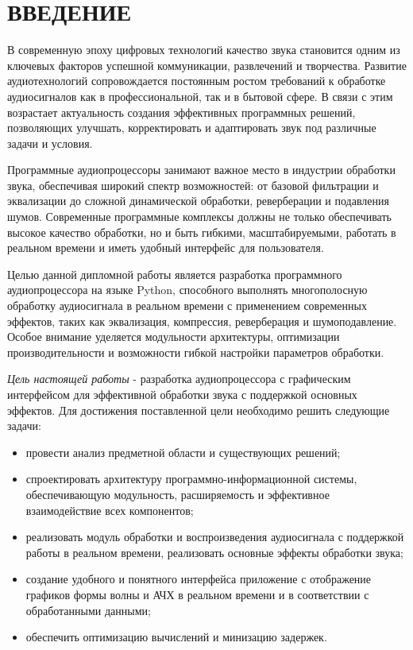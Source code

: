 \section*{ВВЕДЕНИЕ}

В современную эпоху цифровых технологий качество звука становится одним из ключевых факторов успешной коммуникации, развлечений и творчества. Развитие аудиотехнологий сопровождается постоянным ростом требований к обработке аудиосигналов как в профессиональной, так и в бытовой сфере. В связи с этим возрастает актуальность создания эффективных программных решений, позволяющих улучшать, корректировать и адаптировать звук под различные задачи и условия.

Программные аудиопроцессоры занимают важное место в индустрии обработки звука, обеспечивая широкий спектр возможностей: от базовой фильтрации и эквализации до сложной динамической обработки, реверберации и подавления шумов. Современные программные комплексы должны не только обеспечивать высокое качество обработки, но и быть гибкими, масштабируемыми, работать в реальном времени и иметь удобный интерфейс для пользователя.

Целью данной дипломной работы является разработка программного аудиопроцессора на языке Python, способного выполнять многополосную обработку аудиосигнала в реальном времени с применением современных эффектов, таких как эквализация, компрессия, реверберация и шумоподавление. Особое внимание уделяется модульности архитектуры, оптимизации производительности и возможности гибкой настройки параметров обработки.

\emph{Цель настоящей работы} - разработка аудиопроцессора с графическим интерфейсом для эффективной обработки звука с поддержкой основных эффектов. Для достижения поставленной цели необходимо решить следующие задачи:
\begin{itemize}
	\item провести анализ предметной области и существующих решений;
	\item спроектировать архитектуру программно-информационной системы, обеспечивающую модульность, расширяемость и эффективное взаимодействие всех компонентов;
	\item реализовать модуль обработки и воспроизведения аудиосигнала с поддержкой работы в реальном времени, реализовать основные эффекты обработки звука;
	\item создание удобного и понятного интерфейса приложение с отображение графиков формы волны и АЧХ в реальном времени и в соответствии с обработанными данными;
	\item обеспечить оптимизацию вычислений и минизацию задержек. 
\end{itemize}	

